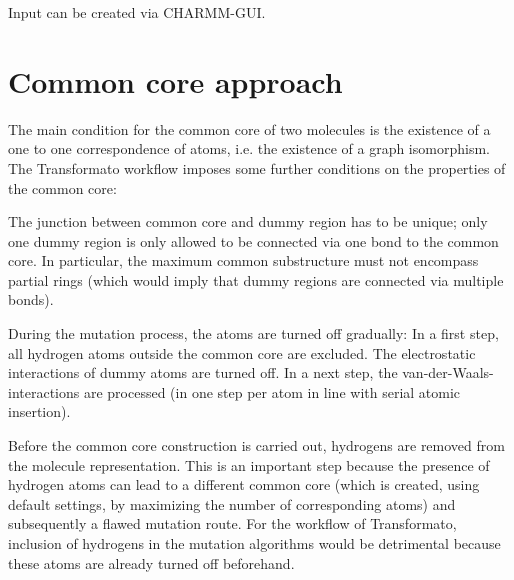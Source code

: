 Input can be created via CHARMM-GUI\cite{Jo.2008}\cite{Braunsfeld.}.

\section{Common core approach}

The main condition for the common core of two molecules is the existence
of a one to one correspondence of atoms, i.e. the existence of a graph
isomorphism. The Transformato workflow imposes some further conditions
on the properties of the common core:

The junction between common core and dummy region has to be unique;
only one dummy region is only allowed to be connected via one bond to the
common core. In particular, the maximum common substructure must not
encompass partial rings (which would imply that dummy regions are
connected via multiple bonds).

During the mutation process, the atoms are turned off gradually: In
a first step, all hydrogen atoms outside the common core are excluded.
The electrostatic interactions of dummy atoms are turned off. In a
next step, the van-der-Waals-interactions are processed (in one step
per atom in line with serial atomic insertion). 

Before the common core construction is carried out, hydrogens are
removed from the molecule representation. This is an important step
because the presence of hydrogen atoms can lead to a different common
core (which is created, using default settings, by maximizing the
number of corresponding atoms) and subsequently a flawed mutation
route. For the workflow of Transformato, inclusion of hydrogens in
the mutation algorithms would be detrimental because these atoms are
already turned off beforehand.